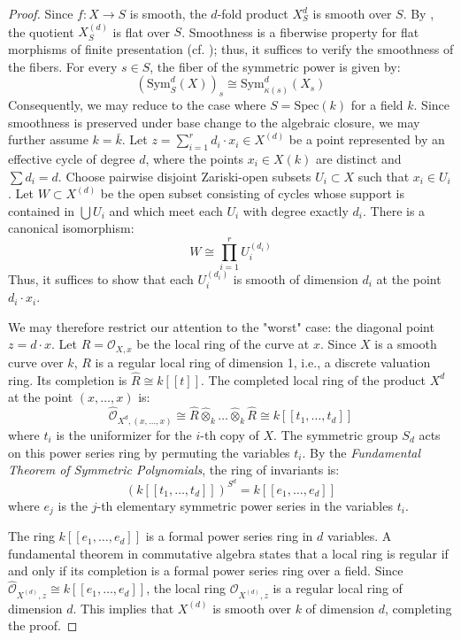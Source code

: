     \begin{proof}Since $f: X \to S$ is smooth, the $d$-fold product $X_S^d$ is smooth over $S$. By , the quotient $X_S^{(d)}$ is flat over $S$. Smoothness is a fiberwise property for flat morphisms of finite presentation (cf. ); thus, it suffices to verify the smoothness of the fibers. 
        For every $s \in S$, the fiber of the symmetric power is given by:$$(\text{Sym}^d_S(X))_s \cong \text{Sym}^d_{\kappa(s)}(X_s)$$Consequently, we may reduce to the case where $S = \text{Spec}(k)$ for a field $k$. 
        Since smoothness is preserved under  base change to the algebraic closure, we may further assume $k = \bar{k}$.
        Let $z = \sum_{i=1}^{r} d_i \cdot x_i \in X^{(d)}$ be a point represented by an effective cycle of degree $d$, where the points $x_i \in X(k)$ are distinct and $\sum d_i = d$. Choose pairwise disjoint Zariski-open subsets $U_i \subset X$ such that $x_i \in U_i$. Let $W \subset X^{(d)}$ be the open subset consisting of cycles whose support is contained in $\bigcup U_i$ and which meet each $U_i$ with degree exactly $d_i$. There is a canonical isomorphism:
$$W \cong \prod_{i=1}^r U_i^{(d_i)}$$
Thus, it suffices to show that each $U_i^{(d_i)}$ is smooth of dimension $d_i$ at the point $d_i \cdot x_i$. 

We may therefore restrict our attention to the "worst" case: the diagonal point $z = d \cdot x$. Let $R = \mathcal{O}_{X,x}$ be the local ring of the curve at $x$. Since $X$ is a smooth curve over $k$, $R$ is a regular local ring of dimension 1, i.e., a discrete valuation ring. Its completion is $\hat{R} \cong k[[t]]$. The completed local ring of the product $X^d$ at the point $(x, \dots, x)$ is:
$$\hat{\mathcal{O}}_{X^d, (x, \dots, x)} \cong \hat{R} \hat{\otimes}_k \dots \hat{\otimes}_k \hat{R} \cong k[[t_1, \dots, t_d]]$$
where $t_i$ is the uniformizer for the $i$-th copy of $X$. The symmetric group $S_d$ acts on this power series ring by permuting the variables 
$t_i$. By the \textit{Fundamental Theorem of Symmetric Polynomials}, the ring of invariants is:
$$\left( k[[t_1, \dots, t_d]] \right)^{S^d} = k[[e_1, \dots, e_d]]$$
where $e_j$ is the $j$-th elementary symmetric power series in the variables $t_i$.

The ring $k[[e_1, \dots, e_d]]$ is a formal power series ring in $d$ variables. A fundamental theorem in commutative algebra states that a local ring is regular if and only if its completion is a formal power series ring over a field. Since $\hat{\mathcal{O}}_{X^{(d)}, z} \cong k[[e_1, \dots, e_d]]$, the local ring $\mathcal{O}_{X^{(d)}, z}$ is a regular local ring of dimension $d$. This implies that $X^{(d)}$ is smooth over $k$ of dimension $d$, completing the proof.
\end{proof}

